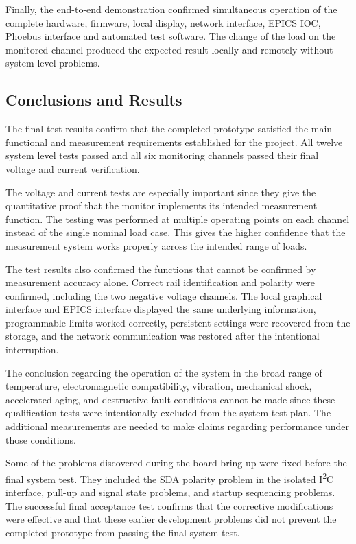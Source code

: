 Finally, the end-to-end demonstration confirmed simultaneous operation of the complete hardware, firmware, local display, network interface, EPICS IOC, Phoebus interface and automated test software. The change of the load on the monitored channel produced the expected result locally and remotely without system-level problems.

\subsection{Conclusions and Results}

The final test results confirm that the completed prototype satisfied the main functional and measurement requirements established for the project. All twelve system level tests passed and all six monitoring channels passed their final voltage and current verification.

The voltage and current tests are especially important since they give the quantitative proof that the monitor implements its intended measurement function. The testing was performed at multiple operating points on each channel instead of the single nominal load case. This gives the higher confidence that the measurement system works properly across the intended range of loads.

The test results also confirmed the functions that cannot be confirmed by measurement accuracy alone. Correct rail identification and polarity were confirmed, including the two negative voltage channels. The local graphical interface and EPICS interface displayed the same underlying information, programmable limits worked correctly, persistent settings were recovered from the storage, and the network communication was restored after the intentional interruption.

The conclusion regarding the operation of the system in the broad range of temperature, electromagnetic compatibility, vibration, mechanical shock, accelerated aging, and destructive fault conditions cannot be made since these qualification tests were intentionally excluded from the system test plan. The additional measurements are needed to make claims regarding performance under those conditions.

Some of the problems discovered during the board bring-up were fixed before the final system test. They included the SDA polarity problem in the isolated I\textsuperscript{2}C interface, pull-up and signal state problems, and startup sequencing problems. The successful final acceptance test confirms that the corrective modifications were effective and that these earlier development problems did not prevent the completed prototype from passing the final system test.

